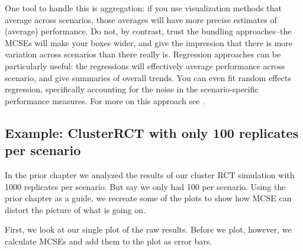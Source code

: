 \documentclass[
]{book}
\begin{document}
One tool to handle this is aggregation: if you use visualization methods that average across scenarios, those averages will have more precise estimates of (average) performance.
Do not, by contrast, trust the bundling approaches--the MCSEs will make your boxes wider, and give the impression that there is more variation across scenarios than there really is.
Regression approaches can be particularly useful: the regressions will effectively average performance across scenario, and give summaries of overall trends.
You can even fit random effects regression, specifically accounting for the noise in the scenario-specific performance measures.
For more on this approach see \citet{gilbert2024multilevel}.

\subsection{Example: ClusterRCT with only 100 replicates per scenario}\label{example-clusterrct-with-only-100-replicates-per-scenario}

In the prior chapter we analyzed the results of our cluster RCT simulation with 1000 replicates per scenario.
But say we only had 100 per scenario.
Using the prior chapter as a guide, we recreate some of the plots to show how MCSE can distort the picture of what is going on.

First, we look at our single plot of the raw results.
Before we plot, however, we calculate MCSEs and add them to the plot as error bars.
\end{document}
